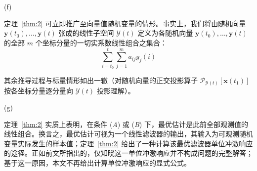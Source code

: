 \begin{remarkn}{(f)}\label{rem:f}

定理~\ref{thm:2} 可立即推广至向量值随机变量的情形。事实上，我们将由随机向量 $\bm{y}(t_0), \dots, \bm{y}(t)$ 张成的线性子空间 $\mathcal{Y}(t)$ 定义为各随机向量 $\bm{y}(t_0), \dots, \bm{y}(t)$ 的全部 $m$ 个坐标分量的一切实系数线性组合之集合：
\begin{equation*}
\sum_{i=t_0}^{t} \sum_{j=1}^{m} a_{ij} y_j(i)
\end{equation*}

其余推导过程与标量情形如出一辙（对随机向量的正交投影算子 $\mathscr{P}_{\mathcal{Y}(t)}[\bm{x}(t_1)]$ 按各坐标分量逐分量向 $\mathcal{Y}(t)$ 投影理解）。

\end{remarkn}

\begin{remarkn}{(g)}\label{rem:g}

定理~\ref{thm:2} 实质上表明，在条件 (\emph{A}) 或 (\emph{B}) 下，最优估计是此前全部观测值的线性组合。换言之，最优估计可视为一个线性滤波器的输出，其输入为可观测随机变量实际发生的样本值；定理~\ref{thm:2} 给出了一种计算该最优滤波器单位冲激响应的途径。正如前文所指出的，仅知晓这一单位冲激响应并不构成问题的完整解答；基于这一原因，本文不再给出计算单位冲激响应的显式公式。

\end{remarkn}
